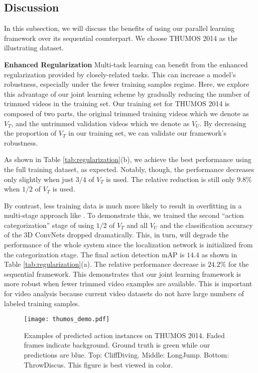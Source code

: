 \documentclass[10pt,twocolumn,letterpaper]{article}
\begin{document}
\subsection{Discussion}
In this subsection, we will discuss the benefits of using our parallel learning framework over its sequential counterpart. We choose THUMOS 2014 as the illustrating dataset. 

\noindent \textbf{Enhanced Regularization}
Multi-task learning can benefit from the enhanced regularization provided by closely-related tasks. This can increase a model's robustness, especially under the fewer training samples regime. Here, we explore this advantage of our joint learning scheme by gradually reducing the number of trimmed videos in the training set. Our training set for THUMOS 2014 is composed of two parts, the original trimmed training videos which we denote as $V_{T}$, and the untrimmed validation videos which we denote as $V_{U}$. By decreasing the proportion of $V_{T}$ in our training set, we can validate our framework's robustness.

As shown in Table \ref{tab:regularization}(b), we achieve the best performance using the full training dataset, as expected. Notably, though, the performance decreases only slightly when just $3/4$ of $V_{T}$ is used. The relative reduction is still only $9.8\%$ when $1/2$ of $V_{T}$ is used. 

By contrast, less training data is much more likely to result in overfitting in a multi-stage approach like \cite{scnn_shou_wang_chang_cvpr16}. To demonstrate this, we trained the second ``action categorization'' stage of \cite{scnn_shou_wang_chang_cvpr16} using $1/2$ of $V_{T}$ and all $V_{U}$ and the classification accuracy of the 3D ConvNets dropped dramatically. This, in turn, will degrade the performance of the whole system since the localization network is initialized from the categorization stage. The final action detection mAP is $14.4$ as shown in Table \ref{tab:regularization}(a). The relative performance decrease is $24.2\%$ for the sequential framework. This demonstrates that our joint learning framework is more robust when fewer trimmed video examples are available. This is important for video analysis because current video datasets do not have large numbers of labeled training samples. 

\begin{figure}[t]
	\centering
	\texttt{[image: thumos\_demo.pdf]}
	\vspace{-10ex}
	\caption{Examples of predicted action instances on THUMOS 2014. Faded frames indicate background. Ground truth is green while our predictions are blue. Top: CliffDiving. Middle: LongJump. Bottom: ThrowDiscus. This figure is best viewed in color. }
	\label{fig:thumosdemo}
\end{figure}
\end{document}
